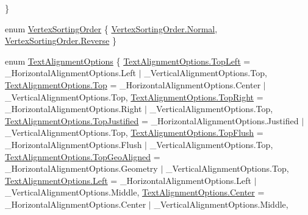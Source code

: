 \begin{DoxyCompactItemize}
 \}
\item 
enum \mbox{\hyperlink{namespace_t_m_pro_a29c2b2e41c29850d1bc0760ac64b1ee0}{Vertex\+Sorting\+Order}} \{ \mbox{\hyperlink{namespace_t_m_pro_a29c2b2e41c29850d1bc0760ac64b1ee0a960b44c579bc2f6818d2daaf9e4c16f0}{Vertex\+Sorting\+Order.\+Normal}}, 
\mbox{\hyperlink{namespace_t_m_pro_a29c2b2e41c29850d1bc0760ac64b1ee0a67f115c1fddc4ce1aeb1c754001585bc}{Vertex\+Sorting\+Order.\+Reverse}}
 \}
\item 
enum \mbox{\hyperlink{namespace_t_m_pro_a1dd743b58b1fd4057c00e4b98ab86301}{Text\+Alignment\+Options}} \{ \newline
\mbox{\hyperlink{namespace_t_m_pro_a1dd743b58b1fd4057c00e4b98ab86301ab32beb056fbfe36afbabc6c88c81ab36}{Text\+Alignment\+Options.\+Top\+Left}} = \+\_\+\+Horizontal\+Alignment\+Options.\+Left $\vert$ \+\_\+\+Vertical\+Alignment\+Options.\+Top, 
\mbox{\hyperlink{namespace_t_m_pro_a1dd743b58b1fd4057c00e4b98ab86301aa4ffdcf0dc1f31b9acaf295d75b51d00}{Text\+Alignment\+Options.\+Top}} = \+\_\+\+Horizontal\+Alignment\+Options.\+Center $\vert$ \+\_\+\+Vertical\+Alignment\+Options.\+Top, 
\mbox{\hyperlink{namespace_t_m_pro_a1dd743b58b1fd4057c00e4b98ab86301a1d85a557894c340c318493f33bfa8efb}{Text\+Alignment\+Options.\+Top\+Right}} = \+\_\+\+Horizontal\+Alignment\+Options.\+Right $\vert$ \+\_\+\+Vertical\+Alignment\+Options.\+Top, 
\mbox{\hyperlink{namespace_t_m_pro_a1dd743b58b1fd4057c00e4b98ab86301a89de49b441e12e9a1c44b7a70ff793c5}{Text\+Alignment\+Options.\+Top\+Justified}} = \+\_\+\+Horizontal\+Alignment\+Options.\+Justified $\vert$ \+\_\+\+Vertical\+Alignment\+Options.\+Top, 
\newline
\mbox{\hyperlink{namespace_t_m_pro_a1dd743b58b1fd4057c00e4b98ab86301a13efa9455246326409a96e8ba0237b2b}{Text\+Alignment\+Options.\+Top\+Flush}} = \+\_\+\+Horizontal\+Alignment\+Options.\+Flush $\vert$ \+\_\+\+Vertical\+Alignment\+Options.\+Top, 
\mbox{\hyperlink{namespace_t_m_pro_a1dd743b58b1fd4057c00e4b98ab86301adc63a63997deeb107fd3aa8e65ebf1ea}{Text\+Alignment\+Options.\+Top\+Geo\+Aligned}} = \+\_\+\+Horizontal\+Alignment\+Options.\+Geometry $\vert$ \+\_\+\+Vertical\+Alignment\+Options.\+Top, 
\mbox{\hyperlink{namespace_t_m_pro_a1dd743b58b1fd4057c00e4b98ab86301a945d5e233cf7d6240f6b783b36a374ff}{Text\+Alignment\+Options.\+Left}} = \+\_\+\+Horizontal\+Alignment\+Options.\+Left $\vert$ \+\_\+\+Vertical\+Alignment\+Options.\+Middle, 
\mbox{\hyperlink{namespace_t_m_pro_a1dd743b58b1fd4057c00e4b98ab86301a4f1f6016fc9f3f2353c0cc7c67b292bd}{Text\+Alignment\+Options.\+Center}} = \+\_\+\+Horizontal\+Alignment\+Options.\+Center $\vert$ \+\_\+\+Vertical\+Alignment\+Options.\+Middle, 

\end{DoxyCompactItemize}

